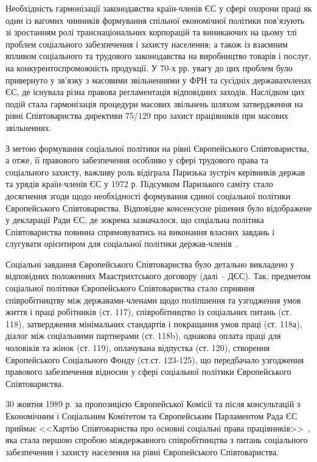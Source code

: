 Необхідність гармонізації законодавства країн-членів ЄС у сфері охорони праці як один із вагомих чинників формування спільної економічної політики пов’язують зі зростанням ролі транснаціональних корпорацій та виникаючих на цьому тлі проблем соціального забезпечення і захисту населення; а також із взаємним впливом соціального та трудового законодавства на виробництво товарів і послуг, на конкурентоспроможність продукції. 
У 70-х рр. увагу до цих проблем було привернуто у зв’язку з масовими звільненнями у ФРН та сусідніх державахчленах ЄС, де існувала різна правова регламентація відповідних заходів.
Наслідком цих подій стала гармонізація процедури масових звільнень шляхом затвердження на рівні Співтовариства директиви 75/129 про захист працівників при масових звільненнях.

З метою формування соціальної політики на рівні Європейського Співтовариства, а отже, її правового забезпечення особливо у сфері трудового права та соціального захисту, важливу роль відіграла Паризька зустріч керівників держав та урядів країн-членів ЄС у 1972 р. 
Підсумком Паризького саміту стало досягнення згоди щодо необхідності формування єдиної соціальної політики Європейського Співтовариства. Відповідне консенсусне рішення було відображене у декларації Ради ЄС, де зокрема зазначалося, що соціальна політика Співтовариства повинна спрямовуватись на виконання власних завдань і слугувати орієнтиром для соціальної політики держав-членів~\cite{Shashula2015}. 

Соціальні завдання Європейського Співтовариства було детально викладено у відповідних положеннях Маастрихтського договору (далі – ДЄС). 
Так, предметом соціальної політики Європейського Співтовариства стало сприяння співробітництву між державами-членами щодо поліпшення та узгодження умов життя і праці робітників (ст. 117), співробітництво із соціальних питань (ст. 118), затвердження мінімальних стандартів і покращання умов праці (ст. 118а), діалог між соціальними партнерами (ст. 118b), однакова оплата праці для чоловіків та жінок (ст. 119), оплачувана відпустка (ст. 120), створення Європейського Соціального Фонду (ст.ст. 123-125), що передбачало узгодження правового забезпечення відносин у сфері соціальної політики Європейського Співтовариства.

30 жовтня 1989 р. за пропозицією Європейської Комісії та після консультацій з Економічним і Соціальним Комітетом та Європейським Парламентом Рада ЄС приймає <<Хартію Співтовариства про основні соціальні права працівників>>~\cite{Khartia96}, яка стала першою спробою міждержавного співробітництва з питань соціального забезпечення і захисту населення на рівні Європейського Співтовариства.


